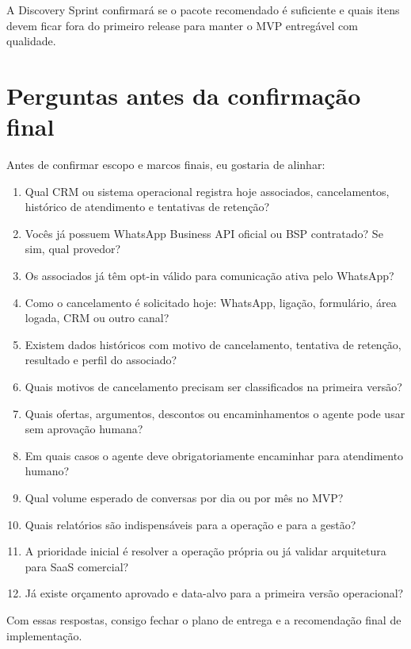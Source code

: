 \documentclass[11pt,a4paper]{article}
\begin{document}
A Discovery Sprint confirmará se o pacote recomendado é suficiente e quais itens devem ficar fora do primeiro release para manter o MVP entregável com qualidade.\par

\section*{Perguntas antes da confirmação final}

Antes de confirmar escopo e marcos finais, eu gostaria de alinhar:\par

\begin{enumerate}
\item Qual CRM ou sistema operacional registra hoje associados, cancelamentos, histórico de atendimento e tentativas de retenção?
\item Vocês já possuem WhatsApp Business API oficial ou BSP contratado? Se sim, qual provedor?
\item Os associados já têm opt-in válido para comunicação ativa pelo WhatsApp?
\item Como o cancelamento é solicitado hoje: WhatsApp, ligação, formulário, área logada, CRM ou outro canal?
\item Existem dados históricos com motivo de cancelamento, tentativa de retenção, resultado e perfil do associado?
\item Quais motivos de cancelamento precisam ser classificados na primeira versão?
\item Quais ofertas, argumentos, descontos ou encaminhamentos o agente pode usar sem aprovação humana?
\item Em quais casos o agente deve obrigatoriamente encaminhar para atendimento humano?
\item Qual volume esperado de conversas por dia ou por mês no MVP?
\item Quais relatórios são indispensáveis para a operação e para a gestão?
\item A prioridade inicial é resolver a operação própria ou já validar arquitetura para SaaS comercial?
\item Já existe orçamento aprovado e data-alvo para a primeira versão operacional?
\end{enumerate}

Com essas respostas, consigo fechar o plano de entrega e a recomendação final de implementação.\par
\end{document}
